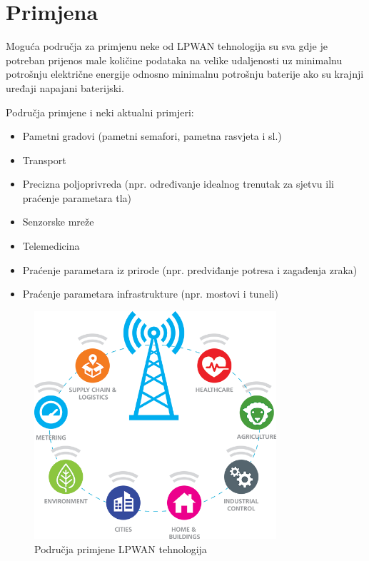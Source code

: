 \section{Primjena}
\label{section:lpwan_primjena}
Moguća područja za primjenu neke od LPWAN tehnologija su sva gdje je potreban prijenos male količine podataka na velike udaljenosti uz minimalnu potrošnju električne energije odnosno minimalnu potrošnju baterije ako su krajnji uređaji napajani baterijski.

\pagebreak
Područja primjene i neki aktualni primjeri:
\begin{itemize}
\item Pametni gradovi (pametni semafori, pametna rasvjeta i sl.)
\item Transport
\item Precizna poljoprivreda (npr. određivanje idealnog trenutak za sjetvu ili praćenje parametara tla)
\item Senzorske mreže
\item Telemedicina
\item Praćenje parametara iz prirode (npr. predviđanje potresa i zagađenja zraka)
\item Praćenje parametara infrastrukture (npr. mostovi i tuneli)
\end{itemize}


\begin{figure}[ht!]
\centering
\includegraphics[width=0.8\textwidth]{images/use_cases.png}
\caption{Područja primjene LPWAN tehnologija}
\label{img:comparison}
\end{figure}


